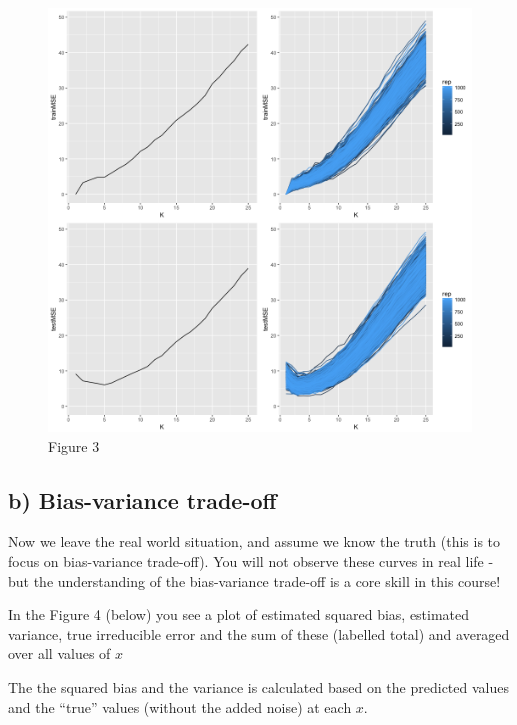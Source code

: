 \documentclass[]{article}
\begin{document}
\begin{figure}
\centering
\includegraphics{Prob1f3.png}
\caption{Figure 3}
\end{figure}

\subsection{b) Bias-variance trade-off}\label{b-bias-variance-trade-off}

Now we leave the real world situation, and assume we know the truth
(this is to focus on bias-variance trade-off). You will not observe
these curves in real life - but the understanding of the bias-variance
trade-off is a core skill in this course!

In the Figure 4 (below) you see a plot of estimated squared bias,
estimated variance, true irreducible error and the sum of these
(labelled total) and averaged over all values of \(x\)

The the squared bias and the variance is calculated based on the
predicted values and the ``true'' values (without the added noise) at
each \(x\).
\end{document}
